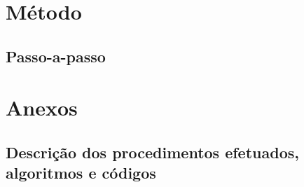 \documentclass[]{report}
\begin{document}

\chapter{Método}
\section{Passo-a-passo}

\chapter*{Anexos}

\section*{Descrição dos procedimentos efetuados, algoritmos e códigos}
\end{document}
